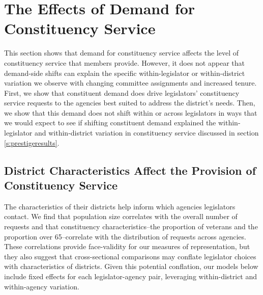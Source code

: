 \documentclass[12pt]{article}
\begin{document}



\section{The Effects of Demand for Constituency Service}\label{s:demand} 

This section shows that demand for constituency service affects the level of constituency service that members provide. However, it does not appear that demand-side shifts can explain the specific within-legislator or within-district variation we observe with changing committee assignments and increased tenure. First, we show that constituent demand does drive legislators' constituency service requests to the agencies best suited to address the district's needs. Then, we show that this demand does not shift within or across legislators in ways that we would expect to see if shifting constituent demand explained the within-legislator and within-district variation in constituency service discussed in section \ref{s:prestigeresults}.

\subsection{District Characteristics Affect the Provision of Constituency Service }

The characteristics of their districts help inform which agencies legislators contact. We find that population size correlates with the overall number of requests and that constituency characteristics--the proportion of veterans and the proportion over 65--correlate with the distribution of requests across agencies. These correlations provide face-validity for our measures of representation, but they also suggest that cross-sectional comparisons may conflate legislator choices with characteristics of districts. Given this potential conflation, our models below include fixed effects for each legislator-agency pair, leveraging within-district and within-agency variation.  
\end{document}
